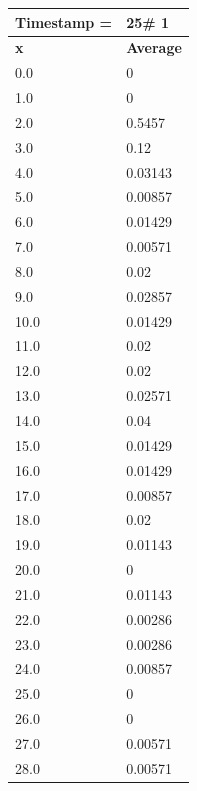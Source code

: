 \begin{tabular}{|l||l|}
\hline
\textbf{Timestamp =} & \textbf{25}\# 1\\\hline
	\textbf{x} & \textbf{Average} \\ \hline
\hline
	0.0 & 0 \\ \hline
	1.0 & 0 \\ \hline
	2.0 & 0.5457 \\ \hline
	3.0 & 0.12 \\ \hline
	4.0 & 0.03143 \\ \hline
	5.0 & 0.00857 \\ \hline
	6.0 & 0.01429 \\ \hline
	7.0 & 0.00571 \\ \hline
	8.0 & 0.02 \\ \hline
	9.0 & 0.02857 \\ \hline
	10.0 & 0.01429 \\ \hline
	11.0 & 0.02 \\ \hline
	12.0 & 0.02 \\ \hline
	13.0 & 0.02571 \\ \hline
	14.0 & 0.04 \\ \hline
	15.0 & 0.01429 \\ \hline
	16.0 & 0.01429 \\ \hline
	17.0 & 0.00857 \\ \hline
	18.0 & 0.02 \\ \hline
	19.0 & 0.01143 \\ \hline
	20.0 & 0 \\ \hline
	21.0 & 0.01143 \\ \hline
	22.0 & 0.00286 \\ \hline
	23.0 & 0.00286 \\ \hline
	24.0 & 0.00857 \\ \hline
	25.0 & 0 \\ \hline
	26.0 & 0 \\ \hline
	27.0 & 0.00571 \\ \hline
	28.0 & 0.00571 \\ \hline
\end{tabular}

